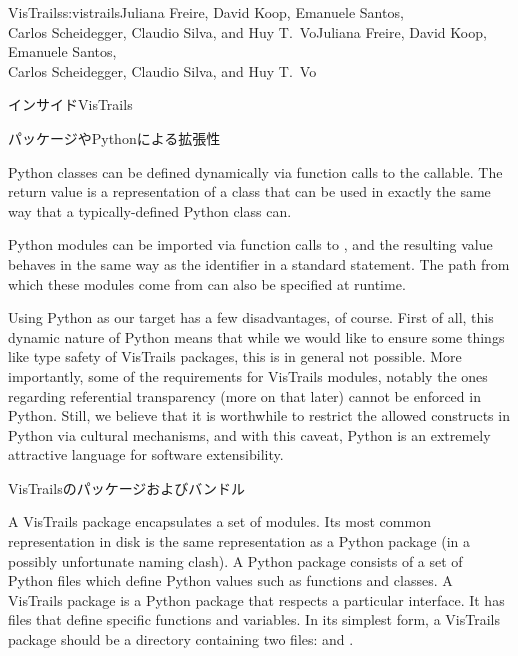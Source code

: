\begin{aosachaptertoc}{VisTrails}{s:vistrails}{Juliana Freire, David Koop, Emanuele Santos, \\ Carlos Scheidegger, Claudio Silva, and Huy T.\ Vo}{Juliana Freire, David Koop, Emanuele Santos, \\ \hspace*{0.9cm} Carlos Scheidegger, Claudio Silva, and Huy T.\ Vo}
\begin{aosasect1}{インサイドVisTrails}
\begin{aosasect2}{パッケージやPythonによる拡張性}
\begin{aosaitemize}

  \item Python classes can be defined dynamically via function calls to
  the  callable. The return value is a representation of a
  class that can be used in exactly the same way that a
  typically-defined Python class can.

  \item Python modules can be imported via function calls to
  , and the resulting value behaves in the same
  way as the identifier in a standard  statement. The
  path from which these modules come from can also be specified at runtime.

\end{aosaitemize}

Using Python as our target has a few disadvantages, of course. First
of all, this dynamic nature of Python means that while we would like
to ensure some things like type safety of VisTrails packages, this is
in general not possible.  More importantly, some of the requirements
for VisTrails modules, notably the ones regarding referential
transparency (more on that later) cannot be enforced in Python. Still,
we believe that it is worthwhile to restrict the allowed constructs in
Python via cultural mechanisms, and with this caveat, Python is an
extremely attractive language for software extensibility.

\end{aosasect2}

\begin{aosasect2}{VisTrailsのパッケージおよびバンドル}

A VisTrails package encapsulates a set of modules. Its most
common representation in disk is the same representation as a Python
package (in a possibly unfortunate naming clash). A Python package
consists of a set of Python files which define Python values such as
functions and classes. A VisTrails package is a Python package that
respects a particular interface. It has files that define specific
functions and variables. In its simplest form, a VisTrails package
should be a directory containing two files:  and
.


\end{aosasect2}
\end{aosasect1}
\end{aosachaptertoc}
